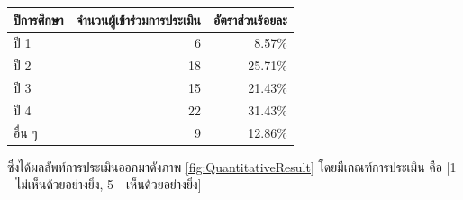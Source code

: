 \begin{enumerate}
\begin{table}[H]
            \label{tab:UserRatio}
            \begin{tabular}{|l|r|r|}
            \hline
            \textbf{ปีการศึกษา} & \multicolumn{1}{l|}{\textbf{จำนวนผู้เข้าร่วมการประเมิน}} & \multicolumn{1}{l|}{\textbf{อัตราส่วนร้อยละ}} \\ \hline
            ปี 1                & 6                                                          & 8.57\%                                         \\ \hline
            ปี 2                & 18                                                         & 25.71\%                                         \\ \hline
            ปี 3                & 15                                                         & 21.43\%                                         \\ \hline
            ปี 4                & 22                                                         & 31.43\%                                         \\ \hline
            อื่น ๆ              & 9                                                          & 12.86\%                                         \\ \hline
            \end{tabular}
        \end{table}
        \par{ซึ่งได้ผลลัพท์การประเมินออกมาดังภาพ \ref{fig:QuantitativeResult} โดยมีเกณฑ์การประเมิน คือ [1 - ไม่เห็นด้วยอย่างยิ่ง, 5 - เห็นด้วยอย่างยิ่ง]}
        \begin{figure}[H]\centering

\end{figure}
\end{enumerate}
